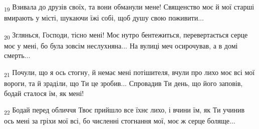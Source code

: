 \begin{tcolorbox}
\textsubscript{19} Взивала до друзів своїх, та вони обманули мене! Священство моє й мої старші вмирають у місті, шукаючи їжі собі, щоб душу свою поживити...
\end{tcolorbox}
\begin{tcolorbox}
\textsubscript{20} Зглянься, Господи, тісно мені! Моє нутро бентежиться, перевертається серце моє у мені, бо була зовсім неслухняна... На вулиці меч осирочував, а в домі смерть...
\end{tcolorbox}
\begin{tcolorbox}
\textsubscript{21} Почули, що я ось стогну, й немає мені потішителя, вчули про лихо моє всі мої вороги, та й зраділи, що Ти це зробив... Спровадив Ти день, що його заповів, бодай сталося їм, як мені!
\end{tcolorbox}
\begin{tcolorbox}
\textsubscript{22} Бодай перед обличчя Твоє прийшло все їхнє лихо, і вчини їм, як Ти учинив ось мені за гріхи мої всі, бо численні стогнання мої, моє ж серце боляще...
\end{tcolorbox}
